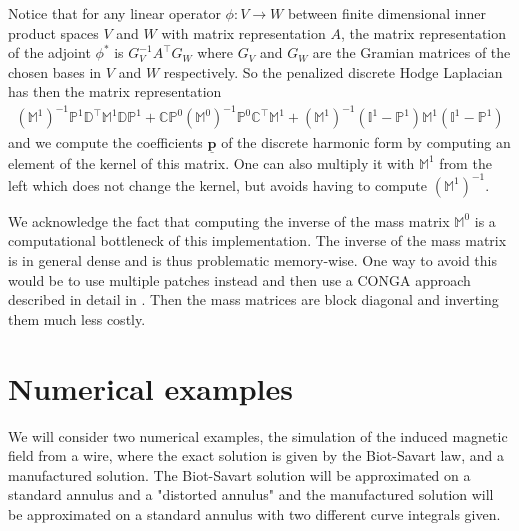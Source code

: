 \documentclass[../master_thesis.tex]{subfiles}
\begin{document}
Notice that for any linear operator $\phi:V \rightarrow W$ between finite dimensional inner product spaces 
$V$ and $W$ with matrix representation $A$, the matrix representation of the
adjoint $\phi^*$ is $G_V^{-1} A^\top G_W$ where 
$G_V$ and $G_W$ are the Gramian matrices of the chosen bases in $V$ and $W$ 
respectively. So the penalized discrete Hodge Laplacian has then the matrix 
representation \begin{align*}
    (\mathbb{M}^1)^{-1} \mathbb{P}^1\mathbb{D}^\top \mathbb{M}^1 \mathbb{D}\mathbb{P}^1 
    + \mathbb{C} \mathbb{P}^0 (\mathbb{M}^0)^{-1} \mathbb{P}^0 \mathbb{C}^\top \mathbb{M}^1
    + (\mathbb{M}^1)^{-1} (\mathbb{I}^1-\mathbb{P}^1) \mathbb{M}^1 (\mathbb{I}^1 - \mathbb{P}^1)
\end{align*} and we compute the 
coefficients $\underline{\mathbf{p}}$ of the discrete harmonic form
by computing an element of the kernel of this matrix. One can also multiply it with 
$\mathbb{M}^1$ from the left which does not change the kernel, but avoids having to 
compute $(\mathbb{M}^1)^{-1}$. 
\begin{remark}
    We acknowledge the fact that computing the inverse of the mass matrix $\mathbb{M}^0$
    is a computational bottleneck of this implementation. The inverse of the mass matrix 
    is in general dense and is thus
    problematic memory-wise. 
    One way to avoid this would be to use multiple patches instead and then use a 
    CONGA approach described in detail in \cite{multipatch_paper}. Then the mass matrices 
    are block diagonal and inverting them much less costly.
\end{remark}


\section{Numerical examples}
We will consider two numerical examples, the simulation of the induced magnetic 
field from a wire, where the exact solution is given by the Biot-Savart law, and 
a manufactured solution. The Biot-Savart solution will be approximated on a standard annulus 
and a "distorted annulus" and the manufactured solution will be approximated 
on a standard annulus with two different curve integrals given.
\end{document}
